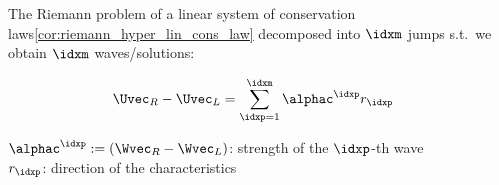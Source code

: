 \begin{corbox}\nospacing
    \begin{cor}\label{cor:jump_decomposition}
        The Riemann problem of a linear system of conservation laws\cref{cor:riemann_hyper_lin_cons_law}
        decomposed into $\idxm$ jumps s.t.\ we obtain $\idxm$ waves/solutions:\\
        \begin{minipage}{0.45\textwidth}
          \begin{align}
            \Uvec_{R}-\Uvec_{L}&=\sum_{\idxp=1}^{\idxm}\alphac^{\idxp}r_{\idxp}\label{eq:decoupled_riemann_problem_for_linear_systems}
          \end{align}
        \end{minipage}\hfill
        \begin{minipage}[c]{0.5\textwidth}
           \begin{figure}[H]
               \centering{
                 \def\svgwidth{150pt}
                 \resizebox{\linewidth}{!}{}
               }
           \end{figure}
        \end{minipage}
          $\alphac^{\idxp}:=(\Wvec_{R}-\Wvec_{L})$: strength of the $\idxp$-th wave\\
          $r_{\idxp}$: direction of the characteristics
    \end{cor}
\end{corbox}

